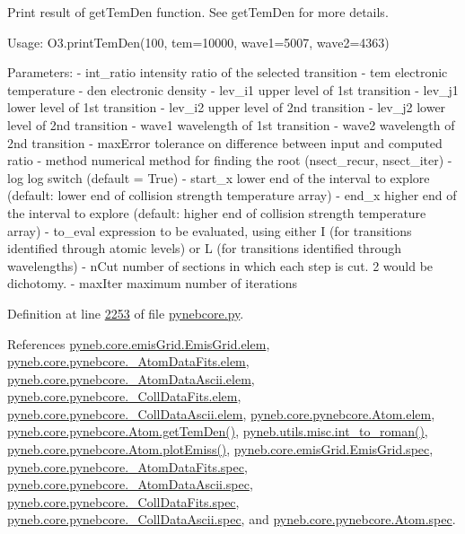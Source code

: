 \begin{DoxyVerb}Print result of getTemDen function. See getTemDen for more details.

Usage:
    O3.printTemDen(100, tem=10000, wave1=5007, wave2=4363)

Parameters:
    - int_ratio    intensity ratio of the selected transition
    - tem          electronic temperature
    - den          electronic density
    - lev_i1       upper level of 1st transition
    - lev_j1       lower level of 1st transition
    - lev_i2       upper level of 2nd transition
    - lev_j2       lower level of 2nd transition
    - wave1        wavelength of 1st transition
    - wave2        wavelength of 2nd transition
    - maxError     tolerance on difference between input and computed ratio 
    - method       numerical method for finding the root (nsect_recur, nsect_iter)
    - log          log switch (default = True)
    - start_x      lower end of the interval to explore (default: lower end of collision 
            strength temperature array)
    - end_x        higher end of the interval to explore (default: higher end of collision 
            strength temperature array)
    - to_eval      expression to be evaluated, using either I (for transitions identified through 
            atomic levels) or L (for transitions identified through wavelengths)
    - nCut        number of sections in which each step is cut. 2 would be dichotomy.
    - maxIter     maximum number of iterations\end{DoxyVerb}
 

Definition at line \hyperlink{pynebcore_8py_source_l02253}{2253} of file \hyperlink{pynebcore_8py_source}{pynebcore.\+py}.



References \hyperlink{emis_grid_8py_source_l00045}{pyneb.\+core.\+emis\+Grid.\+Emis\+Grid.\+elem}, \hyperlink{pynebcore_8py_source_l00083}{pyneb.\+core.\+pynebcore.\+\_\+\+Atom\+Data\+Fits.\+elem}, \hyperlink{pynebcore_8py_source_l00304}{pyneb.\+core.\+pynebcore.\+\_\+\+Atom\+Data\+Ascii.\+elem}, \hyperlink{pynebcore_8py_source_l00560}{pyneb.\+core.\+pynebcore.\+\_\+\+Coll\+Data\+Fits.\+elem}, \hyperlink{pynebcore_8py_source_l00910}{pyneb.\+core.\+pynebcore.\+\_\+\+Coll\+Data\+Ascii.\+elem}, \hyperlink{pynebcore_8py_source_l01165}{pyneb.\+core.\+pynebcore.\+Atom.\+elem}, \hyperlink{pynebcore_8py_source_l02060}{pyneb.\+core.\+pynebcore.\+Atom.\+get\+Tem\+Den()}, \hyperlink{misc_8py_source_l00013}{pyneb.\+utils.\+misc.\+int\+\_\+to\+\_\+roman()}, \hyperlink{pynebcore_8py_source_l02313}{pyneb.\+core.\+pynebcore.\+Atom.\+plot\+Emiss()}, \hyperlink{emis_grid_8py_source_l00046}{pyneb.\+core.\+emis\+Grid.\+Emis\+Grid.\+spec}, \hyperlink{pynebcore_8py_source_l00084}{pyneb.\+core.\+pynebcore.\+\_\+\+Atom\+Data\+Fits.\+spec}, \hyperlink{pynebcore_8py_source_l00305}{pyneb.\+core.\+pynebcore.\+\_\+\+Atom\+Data\+Ascii.\+spec}, \hyperlink{pynebcore_8py_source_l00561}{pyneb.\+core.\+pynebcore.\+\_\+\+Coll\+Data\+Fits.\+spec}, \hyperlink{pynebcore_8py_source_l00911}{pyneb.\+core.\+pynebcore.\+\_\+\+Coll\+Data\+Ascii.\+spec}, and \hyperlink{pynebcore_8py_source_l01166}{pyneb.\+core.\+pynebcore.\+Atom.\+spec}.



